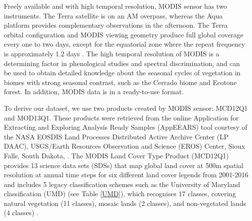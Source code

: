 
Freely available and with high temporal resolution, MODIS sensor has two instruments. The Terra satellite is on an AM overpass, whereas the Aqua platform provides complementary observations in the afternoon. The Terra orbital configuration and MODIS viewing geometry produce full global coverage every one to two days, except for the equatorial zone where the repeat frequency is approximately 1.2 days \citep{zhan_2002, setiawan_2014}. The high temporal resolution of MODIS is a determining factor in phenological studies and spectral discrimination, and can be used to obtain detailed knowledge about the seasonal cycles of vegetation in biomes with strong seasonal contrast, such as the Cerrado biome and Ecotone forest. In addition, MODIS data is in a ready-to-use format.

To derive our dataset, we use two products created by MODIS sensor: MCD12Q1 and MOD13Q1. These products were retrieved from the online Application for Extracting and Exploring Analysis Ready Samples (AppEEARS) tool courtesy of the NASA EOSDIS Land Processes Distributed Active Archive Center (LP DAAC), USGS/Earth Resources Observation and Science (EROS) Center, Sioux Falls, South Dakota, \citep{didan_2015,didan_munoz_2015,sulla_2015,sulla2_2018}. The MODIS Land Cover Type Product (MCD12Q1) provides 13 science data sets (SDSs) that map global land cover at 500m spatial resolution at annual time steps for six different land cover legends from 2001-2016 and includes 5 legacy classification schemes such as the University of Maryland classification (UMD) (see Table \ref{UMD}), which recognises 17 classes, covering natural vegetation (11 classes), mosaic lands (2 classes), and non-vegetated lands (4 classes) \citep{setiawan_2014, friedl_2018}. 

